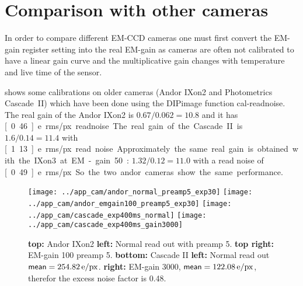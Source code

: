 \section{Comparison with other cameras}
In order to compare different EM-CCD cameras one must first convert
the EM-gain register setting into the real EM-gain as cameras are
often not calibrated to have a linear gain curve and the
multiplicative gain changes with temperature and live time of the
sensor.

 shows some calibrations on older cameras (Andor
IXon2 and Photometrics Cascade~II) which have been done using the
DIPimage function \textsf{cal-readnoise}.  The real gain of the Andor
IXon2 is $0.67/0.062=10.8$ and it has \unit[0.46]{e\ rms/px}
readnoise. The real gain of the Cascade~II is $1.6/0.14=11.4$ with
\unit[1.13]{e\ rms/px} read noise. Approximately the same real gain is
obtained with the IXon3 at EM-gain 50: $1.32/0.12=11.0$ with a read
noise of \unit[0.49]{e\ rms/px}. So the two andor cameras show the
same performance.

\begin{figure}
  \centering
  \texttt{[image: ../app\_cam/andor\_normal\_preamp5\_exp30]}
  \texttt{[image: ../app\_cam/andor\_emgain100\_preamp5\_exp30]}
  \texttt{[image: ../app\_cam/cascade\_exp400ms\_normal]}
  \texttt{[image: ../app\_cam/cascade\_exp400ms\_gain3000]}
  \caption{{\bf top:} Andor IXon2 {\bf left:} Normal read out with
    preamp 5. {\bf top right:} EM-gain 100 preamp 5. {\bf bottom:}
    Cascade II {\bf left:} Normal read out
    $\textsf{mean}=\unit[254.82]{e/px}$. {\bf right:} EM-gain 3000,
    $\textsf{mean}=\unit[122.08]{e/px}$, therefor the excess noise factor
    is 0.48.}
  \label{fig:old-cams}
\end{figure}




